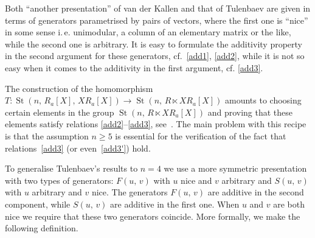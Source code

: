 \documentclass[11pt]{amsart}
\theoremstyle{plain} \declaretheorem[name=Theorem, Refname={Theorem,Theorems}]{tm} \Crefname{tm}{Theorem}{Theorems}
\numberwithin{equation}{section}
\theoremstyle{definition} \newtheorem{df}[lm]{Definition} \Crefname{df}{Definition}{Definitions}
\theoremstyle{remark} \newtheorem{rk}[lm]{Remark} \Crefname{rk}{Remark}{Remarks}
\newcommand{\E}{{\mathrm{E}}}
\newcommand{\St}{\mathop{\mathrm{St}}\nolimits}
\begin{document}
Both ``another presentation'' of van der Kallen and that of Tulenbaev are given in terms of generators parametrised by pairs of vectors,
 where the first one is ``nice'' in some sense i.\,e. unimodular, a column of an elementary matrix or the like, while the second one is arbitrary.
It is easy to formulate the additivity property in the second argument for these generators, cf.~\eqref{add1}, \eqref{add2},
while it is not so easy when it comes to the additivity in the first argument, cf. \eqref{add3}.

The construction of the homomorphism $T\colon\St(n,\,R_a[X],\,XR_a[X])\rightarrow\St(n,\,R\ltimes XR_a[X])$
amounts to choosing certain elements in the group $\St(n,\,R\ltimes XR_a[X])$ and proving that these elements satisfy relations \eqref{add2}--\eqref{add3}, see~\cite[Lemmas~1.2 and~1.3\,c)]{Tul}.
The main problem with this recipe is that the assumption $n\geq5$ is essential for the verification of the fact that relations~\eqref{add3} (or even~\eqref{add3'}) hold.

To generalise Tulenbaev's results to $n=4$ we use a more symmetric presentation with two types of generators: 
$F(u,\,v)$ with $u$ nice and $v$ arbitrary and $S(u,\,v)$ with $u$ arbitrary and $v$ nice.
The generators $F(u,\,v)$ are additive in the second component, while $S(u,\,v)$ are additive in the first one.
When $u$ and $v$ are both nice we require that these two generators coincide.
More formally, we make the following definition.
\end{document}
